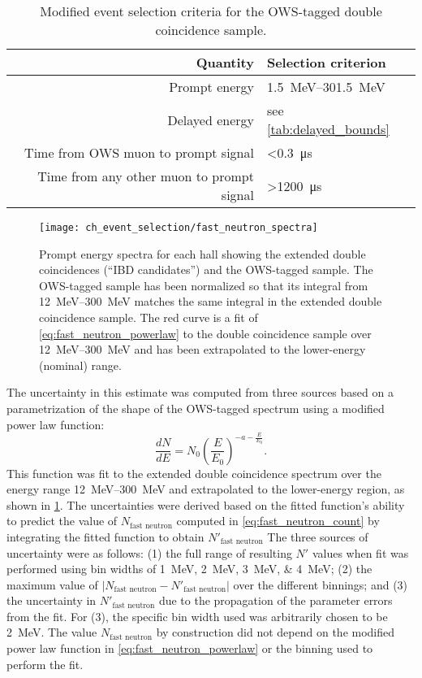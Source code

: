 \begin{table}
    \centering
    \caption{
        Modified event selection criteria for the OWS-tagged
        double coincidence sample.
    }
    \label{tab:fast_neutron}
    \begin{tabular}[t]{rl}
        \toprule
        Quantity & Selection criterion \\
        \midrule
        Prompt energy & \SIrange{1.5}{301.5}{\MeV} \\
        Delayed energy & see \cref{tab:delayed_bounds} \\
        Time from OWS muon to prompt signal & \SI{<0.3}{\us} \\
        Time from any other muon to prompt signal & \SI{>1200}{\us} \\
        \bottomrule
    \end{tabular}
\end{table}

\begin{figure}
    \centering
    \texttt{[image: ch\_event\_selection/fast\_neutron\_spectra]}
    \caption{
        Prompt energy spectra for each hall
        showing the extended double coincidences (``IBD candidates'')
        and the OWS-tagged sample.
        The OWS-tagged sample has been normalized
        so that its integral from \SIrange{12}{300}{\MeV}
        matches the same integral in the extended double coincidence sample.
        The red curve is a fit of \cref{eq:fast_neutron_powerlaw}
        to the double coincidence sample over \SIrange{12}{300}{\MeV}
        and has been extrapolated to the lower-energy (nominal) range.
    }
    \label{fig:fast_neutron}
\end{figure}

The uncertainty in this estimate was computed from three sources
based on a parametri\-zation of the shape of the OWS-tagged spectrum
using a modified power law function:
\begin{equation}\label{eq:fast_neutron_powerlaw}
    \frac{dN}{dE} = N_0 \left(\frac{E}{E_0}\right)^{-a-\frac{E}{E_0}}.
\end{equation}
This function was fit to the extended double coincidence spectrum
over the energy range \SIrange{12}{300}{\MeV}
and extrapolated to the lower-energy region,
as shown in \cref{fig:fast_neutron}.
The uncertainties were derived based on the fitted function's
ability to predict the value of $N_{\text{fast neutron}}$
computed in \cref{eq:fast_neutron_count}
by integrating the fitted function to obtain $N'_\text{fast neutron}$
The three sources of uncertainty were as follows:
(1) the full range of resulting $N'$ values
when fit was performed using bin widths of \SIlist{1;2;3;4}{\MeV};
(2) the maximum value of $\vert N_\text{fast neutron} - N'_\text{fast neutron}\vert$
over the different binnings;
and (3) the uncertainty in $N'_\text{fast neutron}$ due to
the propagation of the parameter errors from the fit.
For (3), the specific bin width used was arbitrarily chosen to be \SI{2}{\MeV}.
The value $N_\text{fast neutron}$ by construction did not depend
on the modified power law function in \cref{eq:fast_neutron_powerlaw}
or the binning used to perform the fit.

